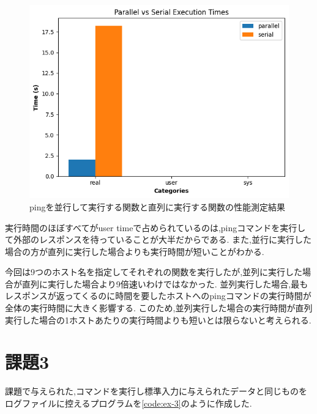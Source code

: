 \documentclass[autodetect-engine, dvi=dvipdfmx, 10pt, a4paper, ja=standard]{bxjsarticle}
\begin{document}
\begin{figure}[H]
	\centering
	\includegraphics[width=0.8\linewidth]{./ex2.png}
	\caption{pingを並行して実行する関数と直列に実行する関数の性能測定結果}
	\label{fig:ex-2}
\end{figure}

実行時間のほぼすべてがuser timeで占められているのは,pingコマンドを実行して外部のレスポンスを待っていることが大半だからである.
また,並行に実行した場合の方が直列に実行した場合よりも実行時間が短いことがわかる.

今回は9つのホスト名を指定してそれぞれの関数を実行したが,並列に実行した場合が直列に実行した場合より9倍速いわけではなかった.
並列実行した場合,最もレスポンスが返ってくるのに時間を要したホストへのpingコマンドの実行時間が全体の実行時間に大きく影響する.
このため,並列実行した場合の実行時間が直列実行した場合の1ホストあたりの実行時間よりも短いとは限らないと考えられる.

\section{課題3}
\label{sec:ex-3}

課題で与えられた,コマンドを実行し標準入力に与えられたデータと同じものをログファイルに控えるプログラムを\ref{code:ex-3}のように作成した.
\end{document}
